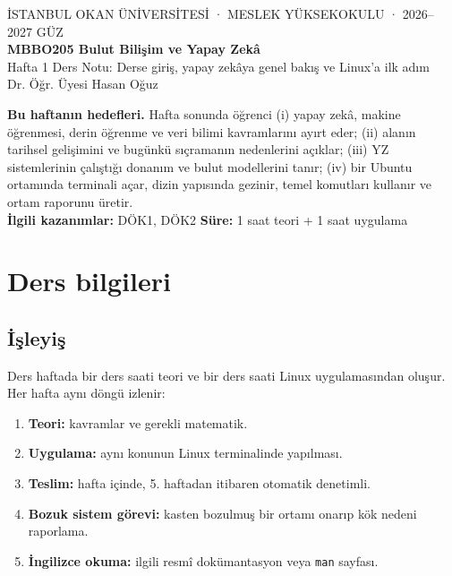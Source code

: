 \documentclass[11pt,a4paper]{article}
\begin{document}
\begin{tcolorbox}[colback=lacivert,colframe=lacivert,arc=2mm,left=5mm,right=5mm,top=4mm,bottom=4mm]
\color{white}\sffamily
{\small İSTANBUL OKAN ÜNİVERSİTESİ · MESLEK YÜKSEKOKULU · 2026–2027 GÜZ}\\[3mm]
{\LARGE\bfseries MBBO205 Bulut Bilişim ve Yapay Zekâ}\\[1mm]
{\large Hafta 1 Ders Notu: Derse giriş, yapay zekâya genel bakış ve Linux'a ilk adım}\\[3mm]
{\small Dr. Öğr. Üyesi Hasan Oğuz}
\end{tcolorbox}

\begin{kutu}
\textbf{Bu haftanın hedefleri.} Hafta sonunda öğrenci (i) yapay zekâ, makine öğrenmesi, derin öğrenme ve veri bilimi kavramlarını ayırt eder; (ii) alanın tarihsel gelişimini ve bugünkü sıçramanın nedenlerini açıklar; (iii) YZ sistemlerinin çalıştığı donanım ve bulut modellerini tanır; (iv) bir Ubuntu ortamında terminali açar, dizin yapısında gezinir, temel komutları kullanır ve ortam raporunu üretir. \\[1mm]
\textbf{İlgili kazanımlar:} DÖK1, DÖK2 \quad \textbf{Süre:} 1 saat teori + 1 saat uygulama
\end{kutu}

\tableofcontents

\section{Ders bilgileri}

\subsection{İşleyiş}
Ders haftada bir ders saati teori ve bir ders saati Linux uygulamasından oluşur. Her hafta aynı döngü izlenir:
\begin{enumerate}
  \item \textbf{Teori:} kavramlar ve gerekli matematik.
  \item \textbf{Uygulama:} aynı konunun Linux terminalinde yapılması.
  \item \textbf{Teslim:} hafta içinde, 5. haftadan itibaren otomatik denetimli.
  \item \textbf{Bozuk sistem görevi:} kasten bozulmuş bir ortamı onarıp kök nedeni raporlama.
  \item \textbf{İngilizce okuma:} ilgili resmî dokümantasyon veya \texttt{man} sayfası.
\end{enumerate}
\end{document}
